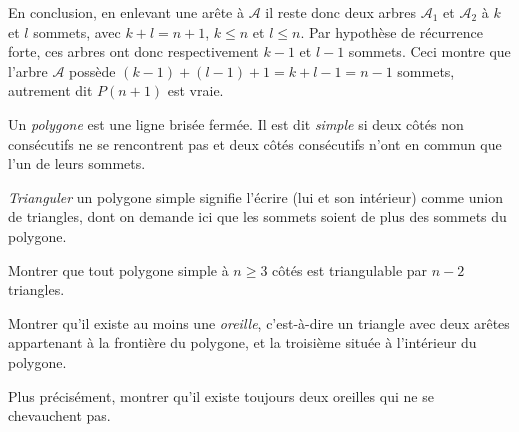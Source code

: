 \begin{exo}
\begin{sol}
En conclusion, en enlevant une arête à $\mathcal A$ il reste donc deux arbres $\mathcal A_1$ et $\mathcal A_2$ à $k$ et $l$ sommets, avec $k+l=n+1$, $k\leq n$ et $l\leq n$. Par hypothèse de récurrence forte, ces arbres ont donc respectivement $k-1$ et $l-1$ sommets. Ceci montre que l'arbre $\mathcal A$ possède $(k-1)+(l-1)+1 = k+l-1=n-1$ sommets, autrement dit $P(n+1)$ est vraie.

\end{sol}
\end{exo}





\begin{exo}[Triangulation d'un polygone]
Un \emph{polygone} est une ligne brisée fermée. Il est dit \emph{simple} si deux côtés non consécutifs ne se rencontrent pas et deux côtés consécutifs n'ont en commun que l'un de leurs sommets.\\
\begin{minipage}{.7\linewidth}
\emph{Trianguler} un polygone simple signifie l'écrire (lui et son intérieur) comme union de triangles, dont on demande ici que les sommets soient de plus des sommets du polygone.

Montrer que tout polygone simple à $n\geq 3$ côtés est triangulable par $n-2$ triangles.
\end{minipage}
\begin{minipage}{.3\linewidth}
\begin{center}
\end{center}
\end{minipage}

\begin{hint}
Montrer qu'il existe au moins une \emph{oreille}, c'est-à-dire un triangle avec deux arêtes appartenant à la frontière du polygone, et la troisième située à l'intérieur du polygone.

Plus précisément, montrer qu'il existe toujours deux oreilles  qui ne se chevauchent pas.
\end{hint}
\end{exo}


